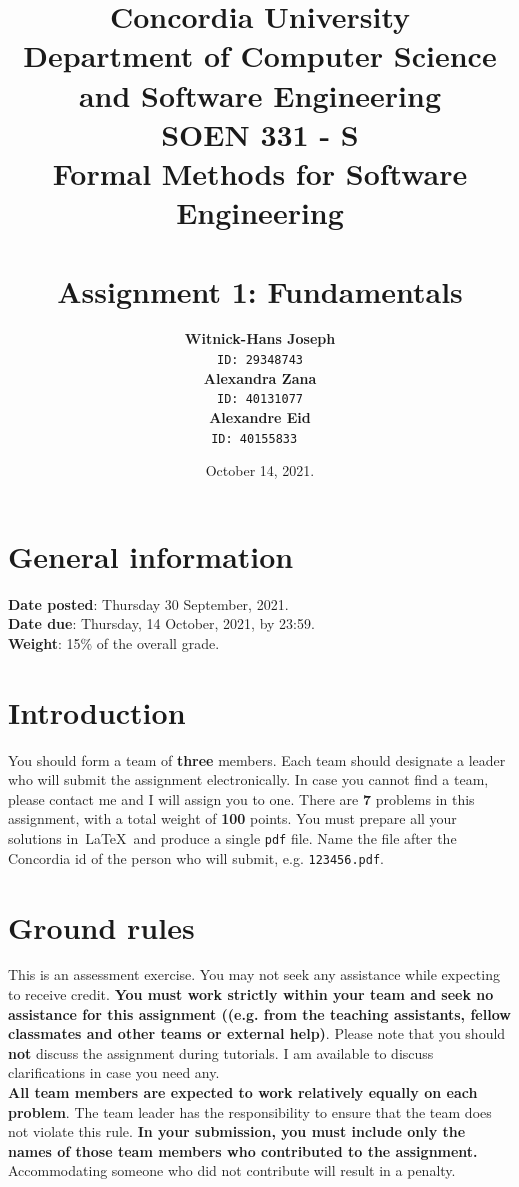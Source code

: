 \documentclass[12pt]{article}
\title{Concordia University\\
Department of Computer Science and Software Engineering\\
\textbf{SOEN 331 - S\\Formal Methods for Software Engineering}\\
\ \\
\textbf{Assignment 1: Fundamentals}}
\author{\textbf{Witnick-Hans Joseph}\\
		\texttt{ID: 29348743}\\
		\textbf{Alexandra Zana}\\
		\texttt{ID: 40131077}\\
		\textbf{Alexandre Eid}\\
		\texttt{ID: 40155833}
\ \\}
\date{October 14, 2021.}
\begin{document}
\maketitle

\newpage
\tableofcontents
\newpage

\section{General information}

\noindent \textbf{Date posted}: Thursday 30 September, 2021.\\
\noindent \textbf{Date due}: Thursday, 14 October, 2021, by 23:59.\\
\noindent \textbf{Weight}: 15\% of the overall grade.

\section{Introduction}
You should form a team of \textbf{three} members. Each team should designate a leader who will submit the assignment electronically. In case you cannot find a team, please contact me and I will assign you to one. There are \textbf{7} problems in this assignment, with a total weight of \textbf{100} points. You must prepare all your solutions in~\LaTeX~and produce a single \texttt{pdf} file. Name the file after the Concordia id of the person who will submit, e.g. \texttt{123456.pdf}.\\

\section{Ground rules}

This is an assessment exercise.  You may not seek any assistance while expecting to receive credit. \textbf{You must work strictly within your team and seek no assistance for this assignment ((e.g. from the teaching assistants, fellow classmates and other teams or external help)}. Please note that you should \textbf{not} discuss the assignment during tutorials. I am available to discuss clarifications in case you need any.\\

\noindent \textbf{All team members are expected to work relatively equally on each problem}. The team leader has the responsibility to ensure that the team does not violate this rule. \textbf{In your submission, you must include only the names of those team members who contributed to the assignment.} Accommodating someone who did not contribute will result in a penalty.\\
\end{document}

